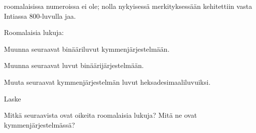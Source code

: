  roomalaisissa numeroissa ei ole; nolla nykyisessä merkityksessään kehitettiin vasta Intiassa 800-luvulla jaa.

\newpage %
\begin{esimerkki}
	Roomalaisia lukuja:
\end{esimerkki}

\begin{tehtavasivu}

\begin{tehtava}
Muunna seuraavat binääriluvut kymmenjärjestelmään.
\begin{vastaus}
\end{vastaus}
\end{tehtava}

\begin{tehtava}
Muunna seuraavat luvut binäärijärjestelmään.
\begin{vastaus}
\end{vastaus}
\end{tehtava}

\begin{tehtava}
Muuta seuraavat kymmenjärjestelmän luvut heksadesimaaliluvuiksi.
\end{tehtava}

\begin{tehtava}
	Laske
	\begin{vastaus}
	\end{vastaus}
\end{tehtava}

\begin{tehtava}
Mitkä seuraavista ovat oikeita roomalaisia lukuja? Mitä ne ovat kymmenjärjestelmässä?
\begin{vastaus}
\end{vastaus}
\end{tehtava}


\end{tehtavasivu}

